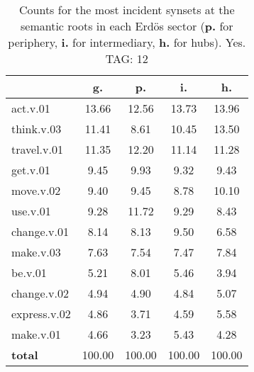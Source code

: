\begin{table}[h!]
\begin{center}
\begin{tabular}{| l | c | c | c | c |}\hline
 & g. & p. & i. & h. \\\hline
act.v.01 & 13.66  & 12.56  & 13.73  & 13.96 \\\hline
think.v.03 & 11.41  & 8.61  & 10.45  & 13.50 \\\hline
travel.v.01 & 11.35  & 12.20  & 11.14  & 11.28 \\\hline
get.v.01 & 9.45  & 9.93  & 9.32  & 9.43 \\\hline
move.v.02 & 9.40  & 9.45  & 8.78  & 10.10 \\\hline
use.v.01 & 9.28  & 11.72  & 9.29  & 8.43 \\\hline
change.v.01 & 8.14  & 8.13  & 9.50  & 6.58 \\\hline
make.v.03 & 7.63  & 7.54  & 7.47  & 7.84 \\\hline
be.v.01 & 5.21  & 8.01  & 5.46  & 3.94 \\\hline
change.v.02 & 4.94  & 4.90  & 4.84  & 5.07 \\\hline
express.v.02 & 4.86  & 3.71  & 4.59  & 5.58 \\\hline
make.v.01 & 4.66  & 3.23  & 5.43  & 4.28 \\\hline
{{\bf total}} & 100.00  & 100.00  & 100.00  & 100.00 \\\hline
\end{tabular}
\caption{Counts for the most incident synsets at the semantic roots in each Erd\"os sector ({\bf p.} for periphery, {\bf i.} for intermediary, {\bf h.} for hubs). Yes. TAG: 12}
\end{center}
\end{table}